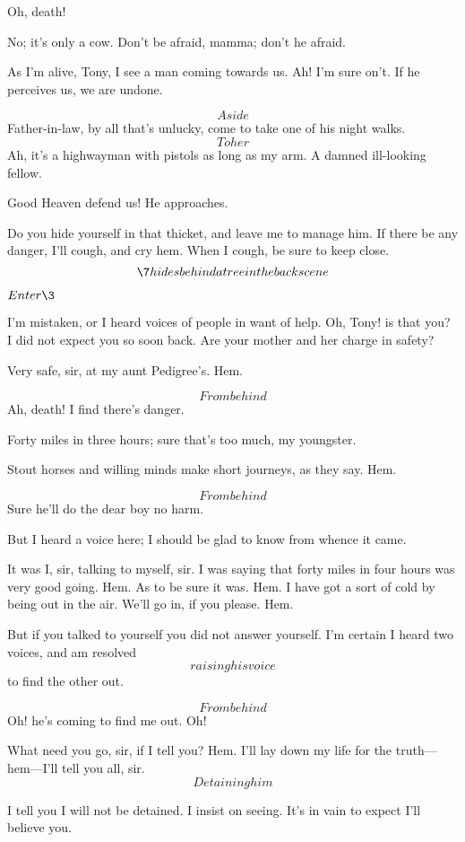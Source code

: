 \documentclass{book}
\begin{document}
\7  Oh, death!

\5  No; it's only a cow.  Don't be afraid, mamma; don't he afraid.

\7  As I'm alive, Tony, I see a man coming towards us. 
Ah!  I'm sure on't.  If he perceives us, we are undone.

\5  \[Aside\]  Father-in-law, by all that's unlucky, come to take one
of his night walks.  \[To her\]  Ah, it's a highwayman with pistols as
long as my arm.  A damned ill-looking fellow.

\7  Good Heaven defend us!  He approaches.

\5  Do you hide yourself in that thicket, and leave me to manage
him.  If there be any danger, I'll cough, and cry hem.  When I cough,
be sure to keep close.  \[\7 hides behind a tree in the back scene\]


\(Enter \3\)


\3  I'm mistaken, or I heard voices of people in want of
help.  Oh, Tony! is that you?  I did not expect you so soon back.  Are
your mother and her charge in safety?

\5  Very safe, sir, at my aunt Pedigree's.  Hem.

\7  \[From behind\]  Ah, death!  I find there's danger.

\3  Forty miles in three hours; sure that's too much, my
youngster.

\5  Stout horses and willing minds make short journeys, as they say. 
Hem.

\7  \[From behind\]  Sure he'll do the dear boy no harm.

\3  But I heard a voice here; I should be glad to know from
whence it came.

\5  It was I, sir, talking to myself, sir.  I was saying that forty
miles in four hours was very good going.  Hem.  As to be sure it was. 
Hem.  I have got a sort of cold by being out in the air.  We'll go in,
if you please.  Hem.

\3  But if you talked to yourself you did not answer
yourself.  I'm certain I heard two voices, and am resolved \[raising his
voice\] to find the other out.

\7  \[From behind\]  Oh! he's coming to find me out.  Oh!

\5  What need you go, sir, if I tell you?  Hem.  I'll lay down my
life for the truth---hem---I'll tell you all, sir.  \[Detaining him\]

\3  I tell you I will not be detained.  I insist on seeing. 
It's in vain to expect I'll believe you.
\end{document}
